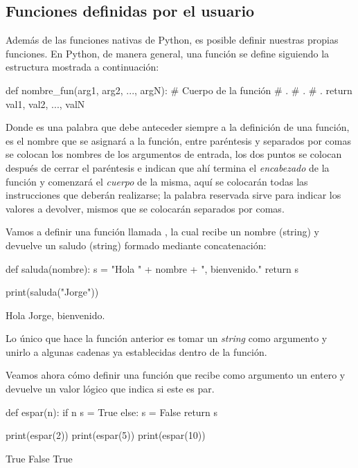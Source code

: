 \subsection{Funciones definidas por el usuario}

Además de las funciones nativas de Python, es posible definir nuestras propias funciones. 
En Python, de manera general, una función se define siguiendo la estructura mostrada a continuación:

\begin{python}
def nombre_fun(arg1, arg2, ..., argN):
	# Cuerpo de la función
	# .
	# .
	# .
	return val1, val2, ..., valN
\end{python}

Donde  es una palabra que debe anteceder siempre a la definición de una función, 
 es el nombre que se asignará a la función, entre paréntesis y 
separados por comas se colocan los nombres de los argumentos de entrada, los dos puntos 
se colocan después de cerrar el paréntesis e indican que ahí termina el \textit{encabezado} de 
la función y comenzará el \textit{cuerpo} de la misma, aquí se colocarán todas las 
instrucciones que deberán realizarse; la palabra reservada  sirve para 
indicar los valores a devolver, mismos que se colocarán separados por comas.

Vamos a definir una función llamada , la cual recibe un nombre (string)
y devuelve un saludo (string) formado mediante concatenación:

\begin{python}
def saluda(nombre):
    s = "Hola " + nombre + ", bienvenido."
    return s

print(saluda("Jorge"))
\end{python}
\begin{outscript}
Hola Jorge, bienvenido.
\end{outscript}

Lo único que hace la función anterior es tomar un \textit{string} como argumento y unirlo 
a algunas cadenas ya establecidas dentro de la función. 

Veamos ahora cómo definir una función que recibe como argumento un entero y devuelve un valor lógico que 
indica si este es par.

\begin{python}
def espar(n):
    if n%
        s = True
    else:
        s = False
    return s

print(espar(2))
print(espar(5))
print(espar(10))
\end{python}
\begin{outscript}
True
False
True
\end{outscript}


